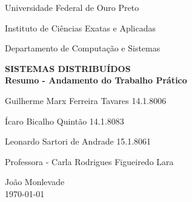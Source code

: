 \documentclass[brazil, a4paper,12pt]{article}
\begin{document}
\begin{titlepage}

  \vfill

  \begin{center}
    \begin{large}
      Universidade Federal de Ouro Preto
    \end{large}
  \end{center}

  \begin{center}
    \begin{large}
      Instituto de Ciências Exatas e Aplicadas
    \end{large}
  \end{center}

  \begin{center}
    \begin{large}
      Departamento de Computação e Sistemas
    \end{large}
  \end{center}

  \vfill

  \begin{center}
    \begin{Large}
      \textbf{SISTEMAS DISTRIBUÍDOS\\[0.4cm] 
        Resumo - Andamento do Trabalho Prático}               
    \end{Large}
  \end{center}


  \vfill

  \begin{center}
    \begin{large}

   	Guilherme Marx Ferreira Tavares \hfill 14.1.8006

	Ícaro Bicalho Quintão \hfill 14.1.8083
	
	Leonardo Sartori de Andrade \hfill 15.1.8061

       \end{large}
  \end{center}

  \begin{center}
    \begin{large}
      Professora - Carla Rodrigues Figueiredo Lara
    \end{large}
  \end{center}

  \vfill

  \begin{center}
    \begin{large}
      João Monlevade \\
      \today \\
    \end{large}
  \end{center}

\clearpage
\tableofcontents 
\end{titlepage}
\end{document}
